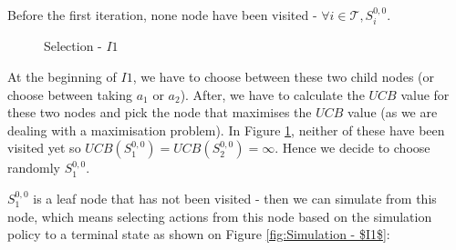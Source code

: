 Before the first iteration, none node have been visited - $\forall i \in \mathcal{T}, S^{0,0}_{i}$.
\begin{figure}[!ht]
    \centering
    \caption{Selection - $I1$}
    \label{fig:Expansion of the tree from the root node}
\end{figure}
At the beginning of $I1$, we have to choose between these two child nodes (or choose between taking $a_1$ or $a_2$). After, we have to calculate the $UCB$ value for these two nodes and pick the node that maximises the $UCB$ value (as we are dealing with a maximisation problem).
In Figure \ref{fig:Expansion of the tree from the root node}, neither of these have been visited yet so $UCB(S^{0,0}_1)=UCB(S^{0,0}_2)=\infty$. Hence we decide to choose randomly $S^{0,0}_1$.

$S^{0,0}_1$ is a leaf node that has not been visited - then we can simulate from this node, which means selecting actions from this node based on the simulation policy to a terminal state as shown on Figure \ref{fig:Simulation - $I1$}:

